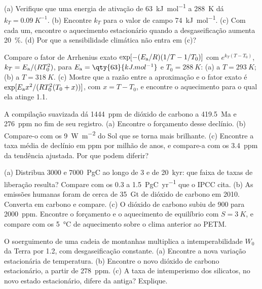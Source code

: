 \begin{exercise}[$\star\star$]\label{exo:b2:deep-time-climate:5}
(a) Verifique que uma energia de ativação de \qty{63}{kJ.mol^{-1}} a \qty{288}{K} dá $k_T =
\qty{0.09}{K^{-1}}$. (b) Encontre $k_T$ para o valor de campo \qty{74}{kJ.mol^{-1}}. (c) Com cada um, encontre
o aquecimento estacionário quando a desgaseificação aumenta \qty{20}{\percent}. (d) Por que a sensibilidade
climática não entra em (c)?
\end{exercise}

\begin{exercise}[$\star\star$]\label{exo:b2:deep-time-climate:6}
Compare o fator de Arrhenius exato $\exp[-(E_{\text a}/R)(1/T - 1/T_0)]$ com $e^{k_T(T -
T_0)}$, $k_T = E_{\text a}/(RT_0^2)$, para $E_{\text a} = \qty{63}{kJ.mol^{-1}}$ e $T_0 =
\qty{288}{K}$: (a) a $T = \qty{293}{K}$; (b) a $T = \qty{318}{K}$. (c) Mostre que a razão entre a
aproximação e o fator exato é $\exp[E_{\text a}x^2/(RT_0^2(T_0 + x))]$, com $x = T - T_0$,
e encontre o aquecimento para o qual ela atinge 1.1.
\end{exercise}

\begin{exercise}[$\star\star$]\label{exo:b2:deep-time-climate:7}
A compilação suavizada dá \qty{1444}{ppm} de dióxido de carbono a \qty{419.5}{Ma} e
\qty{276}{ppm} no fim de seu registro. (a) Encontre o forçamento desse declínio. (b) Compare-o com
os \qty{9}{W.m^{-2}} do Sol que se torna mais brilhante. (c) Encontre a taxa média de declínio em ppm por milhão de
anos, e compare-a com os \qty{3.4}{ppm} da tendência ajustada. Por que podem diferir?
\end{exercise}

\begin{exercise}[$\star\star$]\label{exo:b2:deep-time-climate:8}
(a) Distribua \num{3000} e \qty{7000}{PgC} ao longo de 3 e de \qty{20}{kyr}: que faixa de taxas de
liberação resulta? Compare com os 0.3 a \qty{1.5}{PgC.yr^{-1}} que o IPCC cita. (b) As emissões humanas
foram de cerca de \qty{35}{Gt} de dióxido de carbono em 2010. Converta em carbono e compare. (c) O dióxido de
carbono subiu de 900 para \qty{2000}{ppm}. Encontre o forçamento e o aquecimento de equilíbrio com $S =
\qty{3}{K}$, e compare com os \qty{5}{\celsius} de aquecimento sobre o clima anterior ao PETM.
\end{exercise}

\begin{exercise}[$\star\star$]\label{exo:b2:deep-time-climate:9}
O soerguimento de uma cadeia de montanhas multiplica a intemperabilidade $W_0$ da Terra por 1.2, com
desgaseificação constante. (a) Encontre a nova variação estacionária de temperatura. (b) Encontre o novo
dióxido de carbono estacionário, a partir de \qty{278}{ppm}. (c) A taxa de intemperismo dos silicatos, no novo
estado estacionário, difere da antiga? Explique.
\end{exercise}

